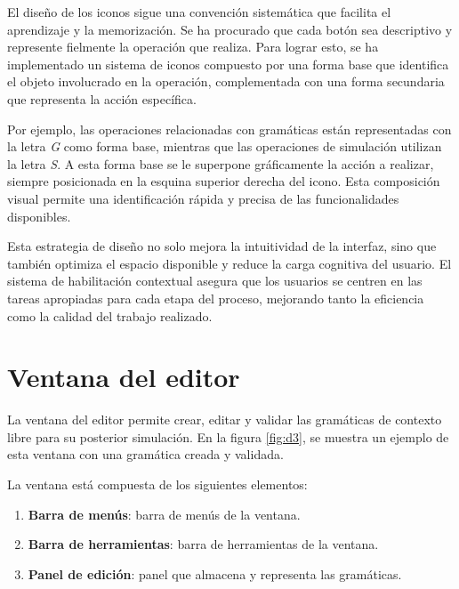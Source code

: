 El diseño de los iconos sigue una convención sistemática que facilita el aprendizaje y la memorización. Se ha procurado que cada botón sea descriptivo y represente fielmente la operación que realiza. Para lograr esto, se ha implementado un sistema de iconos compuesto por una forma base que identifica el objeto involucrado en la operación, complementada con una forma secundaria que representa la acción específica.

Por ejemplo, las operaciones relacionadas con gramáticas están representadas con la letra \textit{G} como forma base, mientras que las operaciones de simulación utilizan la letra \textit{S}. A esta forma base se le superpone gráficamente la acción a realizar, siempre posicionada en la esquina superior derecha del icono. Esta composición visual permite una identificación rápida y precisa de las funcionalidades disponibles.

Esta estrategia de diseño no solo mejora la intuitividad de la interfaz, sino que también optimiza el espacio disponible y reduce la carga cognitiva del usuario. El sistema de habilitación contextual asegura que los usuarios se centren en las tareas apropiadas para cada etapa del proceso, mejorando tanto la eficiencia como la calidad del trabajo realizado.
  

\section{Ventana del editor}

La ventana del editor permite crear, editar y validar las gramáticas de contexto libre para su posterior simulación. En la figura \ref{fig:d3}, se muestra un ejemplo de esta ventana con una gramática creada y validada.

La ventana está compuesta de los siguientes elementos:
\begin{enumerate}
 \item \textbf{Barra de menús}: barra de menús de la ventana.
 \item \textbf{Barra de herramientas}: barra de herramientas de la ventana.
 \item \textbf{Panel de edición}: panel que almacena y representa las gramáticas.
\end{enumerate}

